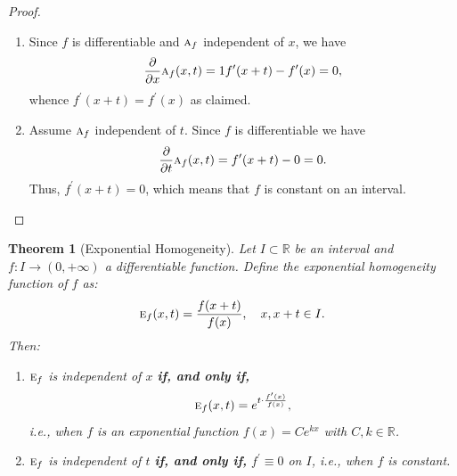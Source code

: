 \documentclass{amsart}
\newtheorem{theorem}{Theorem}
\theoremstyle{plain}
\numberwithin{equation}{section}
\newcommand{\ah}{\textsc{a}}
\newcommand{\eh}{\textsc{e}}
\begin{document}
\begin{proof} 
\begin{enumerate}
    \item 
    Since $f$ is differentiable and $\ah_f$ independent of $x$, we have
    \begin{equation*}
\frac{\partial}{\partial x} \ah_f(x,t) = 
1 f^\prime (x+t) -  f^\prime (x)
=0,
\end{equation*}
whence $f^\prime (x+t) =  f^\prime (x)$ as claimed.

  \item 
Assume $\ah_f$ independent of $t$.
Since $f$ is differentiable we have
    \begin{equation*}
\frac{\partial}{\partial t} \ah_f(x,t) = 
 f^\prime (x+t) - 0
=0.
\end{equation*}
Thus, $f^\prime (x+t) =0$,
which means that $f$ is constant on an interval.
\end{enumerate} 
\end{proof}


\begin{theorem}[Exponential Homogeneity]
Let \( I \subset \mathbb{R} \) be an interval and \( f:I \to (0, +\infty) \) a differentiable function. 
Define the \emph{exponential homogeneity function} of \( f \) as:
\[
\eh_f(x,t) = \frac{f(x+t)}{f(x)}, \quad x, x+t \in I.
\]
Then:
\begin{enumerate}
    \item \( \eh_f \) is independent of \( x \) \textbf{if, and only if,}
    \[
    \eh_f(x,t) = e^{t \cdot \frac{f'(x)}{f(x)}},
    \]
    i.e., when \( f \) is an exponential function \( f(x) = Ce^{kx} \) with \( C,k \in \mathbb{R} \).

    \item \( \eh_f \) is independent of \( t \) \textbf{if, and only if,} \( f^\prime \equiv 0 \) on \( I \), 
    i.e., when \( f \) is constant.
\end{enumerate}
\end{theorem}
\end{document}

